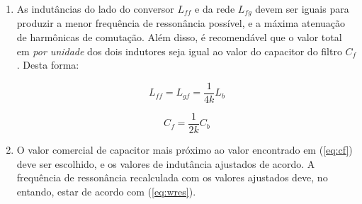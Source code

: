 \begin{enumerate}
        \item As indutâncias do lado do conversor $L_{ff}$ e da rede $L_{fg}$ devem ser iguais para
        produzir a menor frequência de ressonância possível, e a máxima atenuação de harmônicas de
        comutação. Além disso, é recomendável que o valor total em \textit{por unidade} dos dois
        indutores seja igual ao valor do capacitor do filtro $C_f$. Desta forma:

        \begin{equation}
            L_{ff} = L_{gf} = \frac{1}{4k} L_b
        \end{equation}

        \begin{equation}
            C_f = \frac{1}{2k} C_b
        \label{eq:cf}
        \end{equation}

        \item O valor comercial de capacitor mais próximo ao valor encontrado em (\ref{eq:cf})
        deve ser escolhido, e os valores de indutância ajustados de acordo. A frequência de
        ressonância recalculada com os valores ajustados deve, no entando, estar de acordo com
        (\ref{eq:wres}).

    \end{enumerate}



